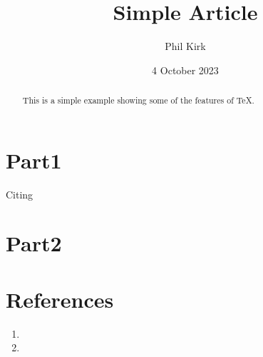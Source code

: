 \documentclass{article}
\title{Simple Article}
\author{Phil Kirk}
\date{4 October 2023}
\begin{document}
\maketitle
\begin{abstract}
    This is a simple example showing some of the features
    of TeX.
\end{abstract}
\tableofcontents
\section{Part1}
Citing\cite{einstein}
\section{Part2}
\kant[20]

\section{References}
\kant[40]

\kant[39]

\begin{enumerate}
\item {}

\kant[41]

\item {}

\kant[43]

\end{enumerate}
\printbibliography
\end{document}
